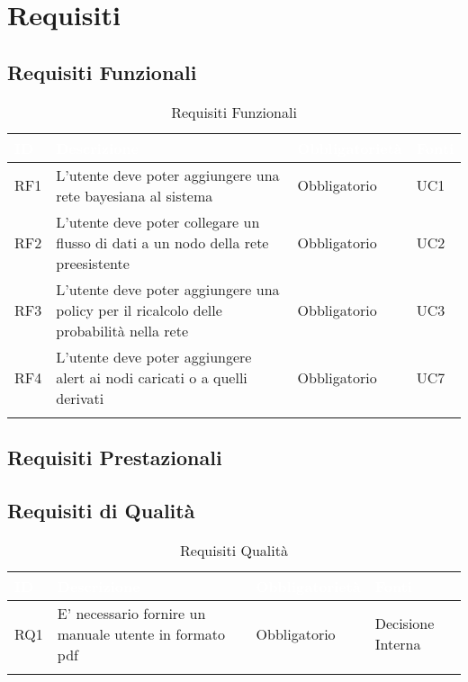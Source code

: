 \section{Requisiti}\label{Requisiti}

\subsection{Requisiti Funzionali}\label{RF}
\begin{center}
\begin{longtable}[c]{|m{}|m{}|m{}|m{}|}
\hline
\rowcolor{bluelogo}\textbf{\textcolor{white}{ID}} & \textbf{\textcolor{white}{Descrizione}} & \textbf{\textcolor{white}{Obbligatorietà}} & \textbf{\textcolor{white}{Fonti}}\\
\hline \hline
\endfirsthead
RF1 & L'utente deve poter aggiungere una rete bayesiana al sistema & Obbligatorio & UC1\\
\hline
\rowcolor{grigio}RF2 & L'utente deve poter collegare un flusso di dati a un nodo della rete preesistente & Obbligatorio & UC2\\
\hline
RF3 & L'utente deve poter aggiungere una policy per il ricalcolo delle probabilità nella rete & Obbligatorio & UC3\\
\hline
\rowcolor{grigio}RF4 & L'utente deve poter aggiungere alert ai nodi caricati o a quelli derivati & Obbligatorio & UC7\\ 
\hline
\caption{Requisiti Funzionali}
\end{longtable}
\end{center}

\subsection{Requisiti Prestazionali}\label{RP}

\subsection{Requisiti di Qualità}\label{RQ}
\begin{center}
\begin{longtable}[c]{|m{}|m{}|m{}|m{}|}
\hline
\rowcolor{bluelogo}\textbf{\textcolor{white}{ID}} & \textbf{\textcolor{white}{Descrizione}} & \textbf{\textcolor{white}{Obbligatorietà}} & \textbf{\textcolor{white}{Fonti}}\\
\hline \hline
\endfirsthead
RQ1 & E' necessario fornire un manuale utente in formato pdf & Obbligatorio & Decisione Interna\\
\hline
\caption{Requisiti Qualità}
\end{longtable}
\end{center}

